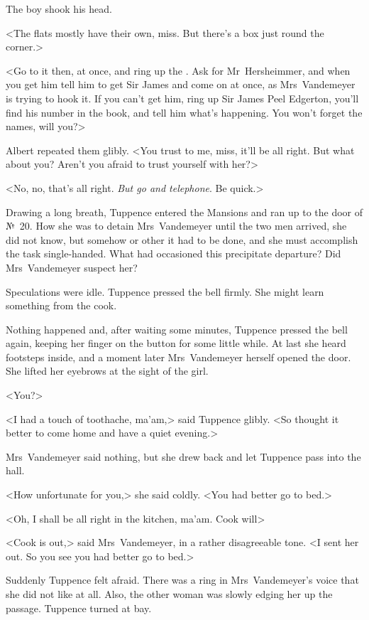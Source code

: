 The boy shook his head.

<The flats mostly have their own, miss. But there's a box just round the corner.>

<Go to it then, at once, and ring up the . Ask for Mr~Hersheimmer, and when you get him tell him to get Sir James and come on at once, as Mrs~Vandemeyer is trying to hook it. If you can't get him, ring up Sir James Peel Edgerton, you'll find his number in the book, and tell him what's happening. You won't forget the names, will you?>

Albert repeated them glibly. <You trust to me, miss, it'll be all right. But what about you? Aren't you afraid to trust yourself with her?>

<No, no, that's all right. \emph{But go and telephone}. Be quick.>

Drawing a long breath, Tuppence entered the Mansions and ran up to the door of №~20. How she was to detain Mrs~Vandemeyer until the two men arrived, she did not know, but somehow or other it had to be done, and she must accomplish the task single-handed. What had occasioned this precipitate departure? Did Mrs~Vandemeyer suspect her?

Speculations were idle. Tuppence pressed the bell firmly. She might learn something from the cook.

Nothing happened and, after waiting some minutes, Tuppence pressed the bell again, keeping her finger on the button for some little while. At last she heard footsteps inside, and a moment later Mrs~Vandemeyer herself opened the door. She lifted her eyebrows at the sight of the girl.

<You?>

<I had a touch of toothache, ma'am,> said Tuppence glibly. <So thought it better to come home and have a quiet evening.>

Mrs~Vandemeyer said nothing, but she drew back and let Tuppence pass into the hall.

<How unfortunate for you,> she said coldly. <You had better go to bed.>

<Oh, I shall be all right in the kitchen, ma'am. Cook will\longdash>

<Cook is out,> said Mrs~Vandemeyer, in a rather disagreeable tone. <I sent her out. So you see you had better go to bed.>

Suddenly Tuppence felt afraid. There was a ring in Mrs~Vandemeyer's voice that she did not like at all. Also, the other woman was slowly edging her up the passage. Tuppence turned at bay.

